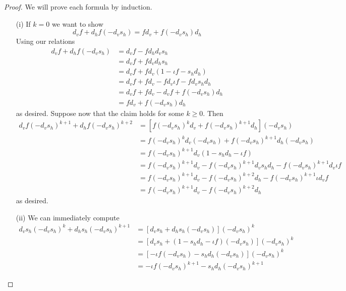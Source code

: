\begin{proof}
    We will prove each formula by induction.
    \begin{itemize}
        \item[(i)] If $k = 0$ we want to show 
        \begin{equation*}
            d_vf+d_hf(-d_vs_h) = fd_v + f(-d_vs_h)d_h
        \end{equation*}
        Using our relations
        \begin{align*}
            d_vf+d_hf(-d_vs_h) &= d_vf - fd_hd_vs_h \\
            &= d_vf+fd_vd_hs_h \\
            &= d_vf+fd_v(1-\iota f-s_hd_h) \\
            &= d_vf+fd_v-fd_v\iota f - fd_vs_hd_h \\
            &= d_vf+fd_v-d_vf + f(-d_vs_h)d_h \\
            &= fd_v+f(-d_vs_h)d_h
        \end{align*}
        as desired. Suppose now that the claim holds for some $k \geq 0$. Then
        \begin{align*}
            d_vf(-d_vs_h)^{k+1}+d_hf(-d_vs_h)^{k+2} &= [f(-d_vs_h)^kd_v+f(-d_vs_h)^{k+1}d_h](-d_vs_h) \\
            &= f(-d_vs_h)^kd_v(-d_vs_h)+f(-d_vs_h)^{k+1}d_h(-d_vs_h) \\
            &= f(-d_vs_h)^{k+1}d_v(1-s_hd_h-\iota f) \\
            &= f(-d_vs_h)^{k+1}d_v-f(-d_vs_h)^{k+1}d_vs_hd_h-f(-d_vs_h)^{k+1}d_v\iota f \\
            &= f(-d_vs_h)^{k+1}d_v-f(-d_vs_h)^{k+2}d_h-f(-d_vs_h)^{k+1}\iota d_vf \\
            &= f(-d_vs_h)^{k+1}d_v-f(-d_vs_h)^{k+2}d_h
        \end{align*}
        as desired.
        \item[(ii)] We can immediately compute
        \begin{align*}
            d_vs_h(-d_vs_h)^k + d_hs_h(-d_vs_h)^{k+1} &= [d_vs_h + d_hs_h(-d_vs_h)](-d_vs_h)^k \\
            &= [d_vs_h + (1-s_hd_h-\iota f)(-d_vs_h)](-d_vs_h)^k \\
            &= [-\iota f(-d_vs_h) - s_hd_h(-d_vs_h)](-d_vs_h)^k \\
            &= -\iota f(-d_vs_h)^{k+1} - s_hd_h(-d_vs_h)^{k+1}
        \end{align*}

\end{itemize}
\end{proof}
